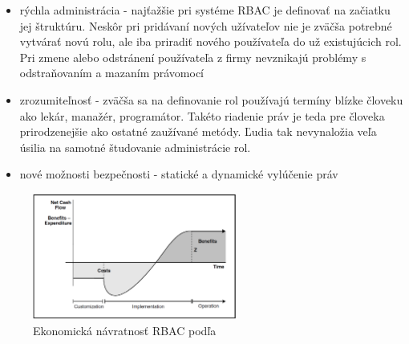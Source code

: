 \begin{itemize}
	\item rýchla administrácia - najťažšie pri systéme RBAC je definovať na začiatku jej štruktúru. Neskôr pri pridávaní nových užívateľov nie je zväčša potrebné vytvárať novú rolu, ale iba priradiť nového používateľa do už existujúcich rol. Pri zmene alebo odstránení používateľa z firmy nevznikajú problémy s odstraňovaním a mazaním právomocí
	\item zrozumiteľnosť - zväčša sa na definovanie rol používajú termíny blízke človeku ako lekár, manažér, programátor. Takéto riadenie práv je teda pre človeka prirodzenejšie ako ostatné zaužívané metódy. Ľudia tak nevynaložia veľa úsilia na samotné študovanie administrácie rol. 
	\item nové možnosti bezpečnosti - statické a dynamické vylúčenie práv
\end{itemize} 

\begin{figure}[h]
	\centerline{\includegraphics[width=0.6\textwidth]{images/rbac_net_cash}}
	\caption{Ekonomická návratnosť RBAC podľa \cite{ekonomika}}
	\label{obr:rbac_net_cash}
\end{figure}












	



